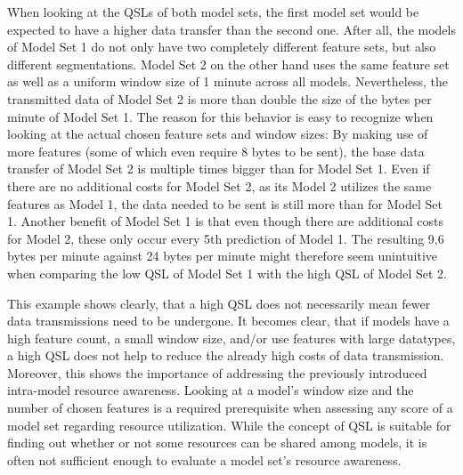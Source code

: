 When looking at the QSLs of both model sets, the first model set would be expected to have a higher data transfer than the second one. After all, the models of Model Set 1 do not only have two completely different feature sets, but also different segmentations. Model Set 2 on the other hand uses the same feature set as well as a uniform window size of 1 minute across all models. Nevertheless, the transmitted data of Model Set 2 is more than double the size of the bytes per minute of Model Set 1. The reason for this behavior is easy to recognize when looking at the actual chosen feature sets and window sizes: By making use of more features (some of which even require 8 bytes to be sent), the base data transfer of Model Set 2 is multiple times bigger than for Model Set 1. Even if there are no additional costs for Model Set 2, as its Model 2 utilizes the same features as Model 1, the data needed to be sent is still more than for Model Set 1. Another benefit of Model Set 1 is that even though there are additional costs for Model 2, these only occur every 5th prediction of Model 1. The resulting 9,6 bytes per minute against 24 bytes per minute might therefore seem unintuitive when comparing the low QSL of Model Set 1 with the high QSL of Model Set 2. 

This example shows clearly, that a high QSL does not necessarily mean fewer data transmissions need to be undergone. It becomes clear, that if models have a high feature count, a small window size, and/or use features with large datatypes, a high QSL does not help to reduce the already high costs of data transmission. Moreover, this shows the importance of addressing the previously introduced intra-model resource awareness. Looking at a model's window size and the number of chosen features is a required prerequisite when assessing any score of a model set regarding resource utilization. While the concept of QSL is suitable for finding out whether or not some resources can be shared among models, it is often not sufficient enough to evaluate a model set's resource awareness. 

